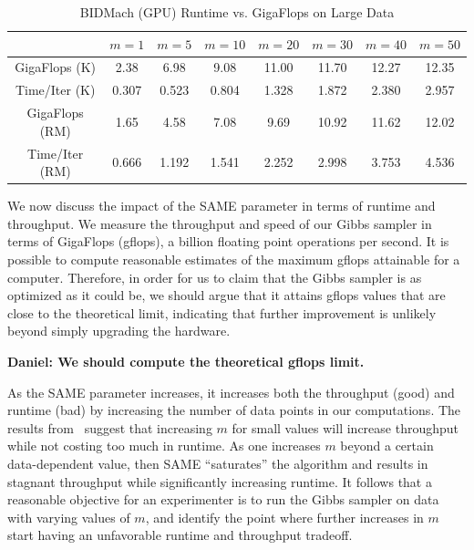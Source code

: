 \documentclass{article} %
\begin{document}
%
%
\begin{table}[t]
\caption{BIDMach (GPU) Runtime vs. GigaFlops on Large Data}
\label{tab:tradeoff}
\begin{center}
\begin{tabular}{ |c|c|c|c|c|c|c|c| } 
\hline
               & $m=1$ & $m=5$ & $m=10$ & $m=20$ & $m=30$ & $m=40$ & $m=50$  \\
\hline \hline
GigaFlops (K)  & 2.38  & 6.98  & 9.08   & 11.00  & 11.70  & 12.27  & 12.35   \\ 
Time/Iter (K)  & 0.307 & 0.523 & 0.804  & 1.328  & 1.872  & 2.380  & 2.957   \\
\hline 
GigaFlops (RM) & 1.65  & 4.58  & 7.08   & 9.69   & 10.92  & 11.62  & 12.02   \\ 
Time/Iter (RM) & 0.666 & 1.192 & 1.541  & 2.252  & 2.998  & 3.753  & 4.536   \\
\hline
\end{tabular}
\end{center}
\end{table}

We now discuss the impact of the SAME parameter in terms of runtime and throughput. We measure the
throughput and speed of our Gibbs sampler in terms of GigaFlops (gflops), a billion floating point
operations per second. It is possible to compute reasonable estimates of the maximum gflops
attainable for a computer. Therefore, in order for us to claim that the Gibbs sampler is as
optimized as it could be, we should argue that it attains gflops values that are close to the
theoretical limit, indicating that further improvement is unlikely beyond simply upgrading the
hardware.

\textbf{Daniel: We should compute the theoretical gflops limit.}

As the SAME parameter increases, it increases both the throughput (good) and runtime (bad) by
increasing the number of data points in our computations. The results from~\citep{SAME2015} suggest
that increasing $m$ for small values will increase throughput while not costing too much in runtime.
As one increases $m$ beyond a certain data-dependent value, then SAME ``saturates'' the algorithm
and results in stagnant throughput while significantly increasing runtime. It follows that a
reasonable objective for an experimenter is to run the Gibbs sampler on data with varying values of
$m$, and identify the point where further increases in $m$ start having an unfavorable runtime and
throughput tradeoff.
\end{document}
